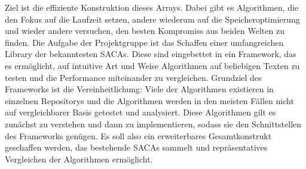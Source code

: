 Ziel ist die effiziente Konstruktion dieses Arrays.
Dabei gibt es Algorithmen, die den Fokus auf die Laufzeit setzen,
andere wiederum auf die Speicheroptimierung und wieder andere versuchen, den besten Kompromiss aus beiden Welten zu finden.
Die Aufgabe der Projektgruppe ist das Schaffen einer umfangreichen Library der bekanntesten SACAs.
Diese sind eingebettet in ein Framework, das es ermöglicht, auf intuitive Art und Weise Algorithmen auf beliebigen
Texten zu testen und die Performance miteinander zu vergleichen.
Grundziel des Frameworks ist die Vereinheitlichung:
Viele der Algorithmen existieren in einzelnen Repositorys und die Algorithmen werden in den meisten Fällen 
nicht auf vergleichbarer Basis getestet und analysiert.
Diese Algorithmen gilt es zunächst zu verstehen
und dann zu implementieren, sodass sie den Schnittstellen des Frameworks genügen.
Es soll also ein erweiterbares Gesamtkonstrukt geschaffen werden, das bestehende SACAs
sammelt und repräsentatives Vergleichen der Algorithmen ermöglicht.


